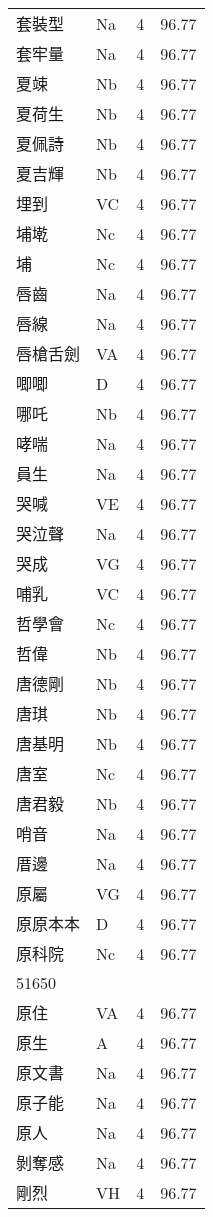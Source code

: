\documentclass[twocolumn]{book}
\begin{document}
\begin{supertabular}{llrr}
套裝型 & Na & 4 &  96.77\\
套牢量 & Na & 4 &  96.77\\
夏竦 & Nb & 4 &  96.77\\
夏荷生 & Nb & 4 &  96.77\\
夏佩詩 & Nb & 4 &  96.77\\
夏吉輝 & Nb & 4 &  96.77\\
埋到 & VC & 4 &  96.77\\
埔墘 & Nc & 4 &  96.77\\
埔 & Nc & 4 &  96.77\\
唇齒 & Na & 4 &  96.77\\
唇線 & Na & 4 &  96.77\\
唇槍舌劍 & VA & 4 &  96.77\\
唧唧 & D & 4 &  96.77\\
哪吒 & Nb & 4 &  96.77\\
哮喘 & Na & 4 &  96.77\\
員生 & Na & 4 &  96.77\\
哭喊 & VE & 4 &  96.77\\
哭泣聲 & Na & 4 &  96.77\\
哭成 & VG & 4 &  96.77\\
哺乳 & VC & 4 &  96.77\\
哲學會 & Nc & 4 &  96.77\\
哲偉 & Nb & 4 &  96.77\\
唐德剛 & Nb & 4 &  96.77\\
唐琪 & Nb & 4 &  96.77\\
唐基明 & Nb & 4 &  96.77\\
唐室 & Nc & 4 &  96.77\\
唐君毅 & Nb & 4 &  96.77\\
哨音 & Na & 4 &  96.77\\
厝邊 & Na & 4 &  96.77\\
原屬 & VG & 4 &  96.77\\
原原本本 & D & 4 &  96.77\\
原科院 & Nc & 4 &  96.77\\
51650\\
原住 & VA & 4 &  96.77\\
原生 & A & 4 &  96.77\\
原文書 & Na & 4 &  96.77\\
原子能 & Na & 4 &  96.77\\
原人 & Na & 4 &  96.77\\
剝奪感 & Na & 4 &  96.77\\
剛烈 & VH & 4 &  96.77\\

\end{supertabular}
\end{document}
